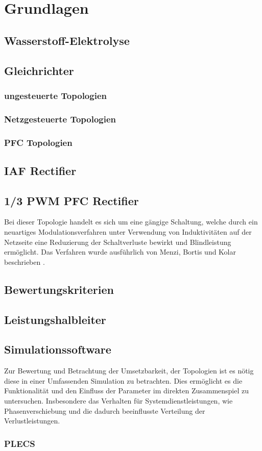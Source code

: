 \chapter{Grundlagen}


\section{Wasserstoff-Elektrolyse}

\section{Gleichrichter}

	\subsection{ungesteuerte Topologien}
	
	\subsection{Netzgesteuerte Topologien}
	
	\subsection{PFC Topologien}
	
\section{IAF Rectifier}

\section{1/3 PWM PFC Rectifier}
Bei dieser Topologie handelt es sich um eine gängige Schaltung, welche durch ein neuartiges Modulationsverfahren unter Verwendung von Induktivitäten auf der Netzseite eine Reduzierung der Schaltverluste bewirkt und Blindleistung ermöglicht. Das Verfahren wurde ausführlich von Menzi, Bortis und Kolar beschrieben \cite{1/3PWMPFC}.
\section{Bewertungskriterien}

\section{Leistungshalbleiter}

\section{Simulationssoftware}
Zur Bewertung und Betrachtung der Umsetzbarkeit, der Topologien ist es nötig diese in einer Umfassenden Simulation zu betrachten. Dies ermöglicht es die Funktionalität und den Einfluss der Parameter im direkten Zusammenspiel zu untersuchen. Insbesondere das Verhalten für Systemdienstleistungen, wie Phasenverschiebung und die dadurch beeinflusste Verteilung der Verlustleistungen. 
	\subsection{PLECS}
